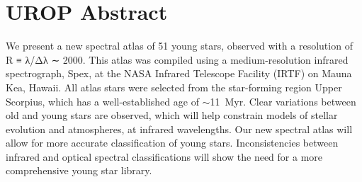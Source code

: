 \section{UROP Abstract}

We present a new spectral atlas of 51 young stars, observed with a resolution of R ≡ λ/Δλ ∼ 2000.  This atlas was compiled using a medium-resolution infrared spectrograph, Spex, at the NASA Infrared Telescope Facility (IRTF) on Mauna Kea, Hawaii.  
All atlas stars were selected from the star-forming region Upper Scorpius, which has a well-established age of $\sim$11~Myr. Clear variations between old and young stars are observed, which will help constrain models of stellar evolution and atmospheres, at infrared wavelengths. Our new spectral atlas will allow for more accurate classification of young stars.  Inconsistencies between infrared and optical spectral classifications will show the need for a more comprehensive young star library.
